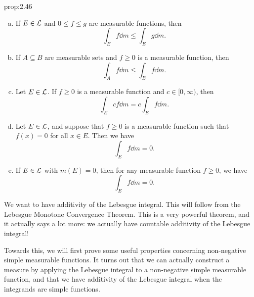 \begin{prop}{prop:2.46}
    \begin{enumerate}[(a)]
        \item If $E \in {\cal L}$ and $0 \leq f \leq g$ are measurable 
        functions, then 
        \[ \int_E f \dd m \leq \int_E g \dd m. \] 
        \item If $A \subseteq B$ are measurable sets and $f \geq 0$ is a 
        measurable function, then 
        \[ \int_A f \dd m \leq \int_B f \dd m. \] 
        \item Let $E \in {\cal L}$. If $f \geq 0$ is a measurable function 
        and $c \in [0, \infty)$, then 
        \[ \int_E cf\dd m = c \int_E f\dd m. \] 
        \item Let $E \in {\cal L}$, and suppose that $f \geq 0$ is a measurable 
        function such that $f(x) = 0$ for all $x \in E$. Then we have 
        \[ \int_E f\dd m = 0. \] 
        \item If $E \in {\cal L}$ with $m(E) = 0$, then for any measurable 
        function $f \geq 0$, we have 
        \[ \int_E f\dd m = 0. \] 
    \end{enumerate}
\end{prop}

We want to have additivity of the Lebesgue integral. This will follow from 
the Lebesgue Monotone Convergence Theorem. This is a very powerful theorem, 
and it actually says a lot more: we actually have countable additivity 
of the Lebesgue integral! 

Towards this, we will first prove some useful properties concerning 
non-negative simple measurable functions. It turns out that we can 
actually construct a measure by applying the Lebesgue integral to a 
non-negative simple measurable function, and that we have additivity 
of the Lebesgue integral when the integrands are simple functions. 

